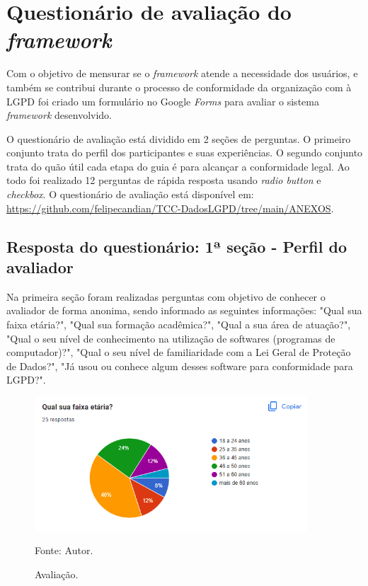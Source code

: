 \documentclass[
	12pt,				%
	openright,			%
	oneside,			%
	a4paper,			%
	english,			%
	french,				%
	spanish,			%
	brazil,				%
	]{abntex2}
\begin{document}
\section{Questionário de avaliação do \textit{framework} }
Com o objetivo de mensurar se o \textit{framework} atende a necessidade dos usuários, e também se contribui durante o processo de conformidade da organização com à LGPD foi criado um formulário no Google \textit{Forms} para avaliar o sistema \textit{framework} desenvolvido. 

O questionário de avaliação está dividido em 2 seções de perguntas. O primeiro conjunto trata do perfil dos participantes e suas experiências. O segundo conjunto trata do quão útil cada etapa do guia é para alcançar a conformidade legal. Ao todo foi realizado 12 perguntas de rápida resposta usando \textit{radio button} e \textit{checkbox}.  O questionário de avaliação está disponível em: \url{https://github.com/felipecandian/TCC-DadosLGPD/tree/main/ANEXOS}.
 
 \subsection{Resposta do questionário: 1ª seção - Perfil do avaliador}
 Na primeira seção foram realizadas perguntas com objetivo de conhecer o avaliador de forma anonima, sendo informado as seguintes informações: "Qual sua faixa etária?", "Qual sua formação acadêmica?", "Qual a sua área de atuação?", "Qual o seu nível de conhecimento na utilização de softwares (programas de computador)?", "Qual o seu nível de familiaridade com a Lei Geral de Proteção de Dados?", "Já usou ou conhece algum desses software para conformidade para LGPD?".
\pagebreak
 
\label{sec: resultados}

\begin{figure}[ht]
    \centering
    \caption{Avaliação.}
    \includegraphics[width=4.0in]{Images/questionario/1.png}
    \label{fig: grafico-acc}
    
    \centering \small Fonte: Autor.
\end{figure}
\end{document}
